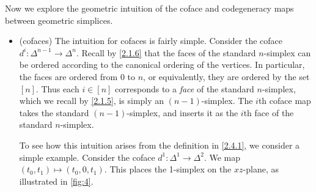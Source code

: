 \begin{intuition}\label{2.4.4}
    Now we explore the geometric intuition of the coface and codegeneracy maps between geometric simplices.
    \begin{itemize}
        \item (cofaces) The intuition for cofaces is fairly simple. Consider the coface $d^i : \Delta^{n-1}\to\Delta^n$. Recall by \cref{2.1.6} that the faces of the standard $n$-simplex can be ordered according to the canonical ordering of the vertices. In particular, the faces are ordered from 0 to $n$, or equivalently, they are ordered by the set $[n]$. Thus each $i\in[n]$ corresponds to a \emph{face} of the standard $n$-simplex, which we recall by \cref{2.1.5}, is simply an $(n-1)$-simplex. The $i$th coface map takes the standard $(n-1)$-simplex, and inserts it as the $i$th face of the standard $n$-simplex.

        To see how this intuition arises from the definition in \cref{2.4.1}, we consider a simple example. Consider the coface $d^1 : \Delta^1\to\Delta^2$. We map $(t_0,t_1)\mapsto (t_0,0,t_1)$. This places the 1-simplex on the $xz$-plane, as illustrated in \cref{fig:4}.
        \begin{figure}[ht]
            \centering
\end{figure}
\end{itemize}
\end{intuition}
